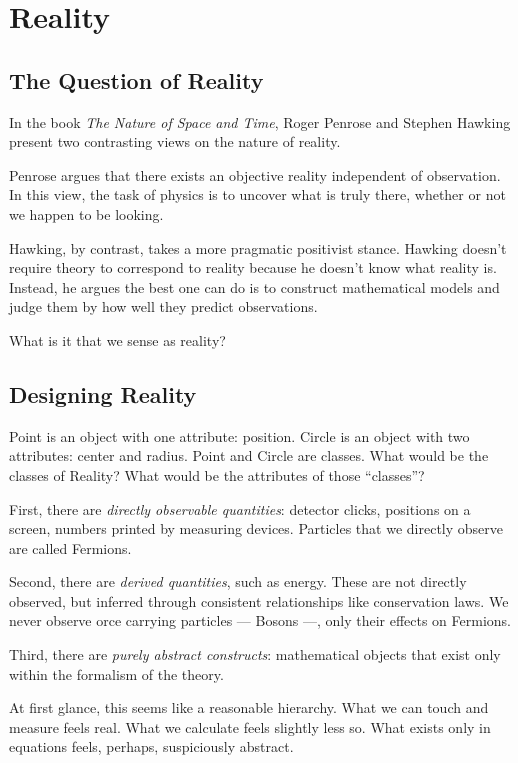 \chapter{Reality}
\label{chap:reality}

\section{The Question of Reality}

In the book \textit{The Nature of Space and Time}, Roger Penrose and Stephen Hawking present two contrasting views on the nature of reality.

Penrose argues that there exists an objective reality independent of observation. In this view, the task of physics is to uncover what is truly there, whether or not we happen to be looking.

Hawking, by contrast, takes a more pragmatic positivist stance. Hawking doesn't require theory to correspond to reality
because he doesn't know what reality is. Instead, he argues the best one can do is to construct mathematical models and
judge them by how well they predict observations.

What is it that we sense as reality?


\section{Designing Reality}

Point is an object with one attribute: position. Circle is an object with two attributes: center and radius. Point and Circle
are classes. What would be the classes of Reality? What would be the attributes of those ``classes''?

First, there are \emph{directly observable quantities}: detector clicks, positions on a screen, numbers printed by measuring devices.
Particles that we directly observe are called Fermions. 

Second, there are \emph{derived quantities}, such as energy.
These are not directly observed, but inferred through consistent relationships like conservation laws.
We never observe orce carrying particles --- Bosons ---, only their effects on Fermions.

Third, there are \emph{purely abstract constructs}: mathematical objects that exist only within the formalism of the theory.

At first glance, this seems like a reasonable hierarchy. What we can touch and measure feels real.
What we calculate feels slightly less so. What exists only in equations feels, perhaps, suspiciously abstract.



